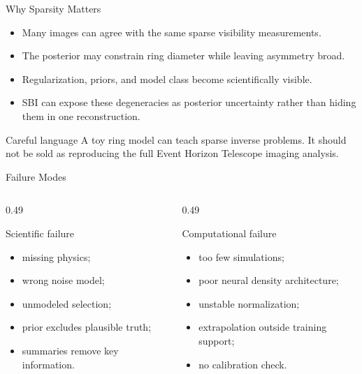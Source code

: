 \documentclass[aspectratio=169,11pt]{beamer}
\newcommand{\tightlist}{\setlength{\itemsep}{0.35em}}
\begin{document}
\begin{frame}{Why Sparsity Matters}
  \begin{itemize}\tightlist
    \item Many images can agree with the same sparse visibility measurements.
    \item The posterior may constrain ring diameter while leaving asymmetry broad.
    \item Regularization, priors, and model class become scientifically visible.
    \item SBI can expose these degeneracies as posterior uncertainty rather than hiding them in one reconstruction.
  \end{itemize}

  \vspace{0.35cm}
  \begin{block}{Careful language}
    A toy ring model can teach sparse inverse problems. It should not be sold as
    reproducing the full Event Horizon Telescope imaging analysis.
  \end{block}
\end{frame}

\begin{frame}{Failure Modes}
  \begin{columns}[T,onlytextwidth]
    \begin{column}{0.49\textwidth}
      \begin{block}{Scientific failure}
        \begin{itemize}\tightlist
          \item missing physics;
          \item wrong noise model;
          \item unmodeled selection;
          \item prior excludes plausible truth;
          \item summaries remove key information.
        \end{itemize}
      \end{block}
    \end{column}
    \begin{column}{0.49\textwidth}
      \begin{block}{Computational failure}
        \begin{itemize}\tightlist
          \item too few simulations;
          \item poor neural density architecture;
          \item unstable normalization;
          \item extrapolation outside training support;
          \item no calibration check.
        \end{itemize}
      \end{block}
    \end{column}
  \end{columns}
\end{frame}
\end{document}
